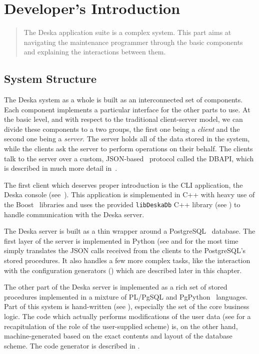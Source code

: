 \documentclass[deska]{subfiles}
\begin{document}
\chapter{Developer's Introduction}
\label{sec:dev-intro}

\begin{abstract}
The Deska application suite is a complex system.  This part aims at navigating the maintenance programmer through the
basic components and explaining the interactions between them.
\end{abstract}

\section{System Structure}
The Deska system as a whole is built as an interconnected set of components.  Each component implements a particular
interface for the other parts to use.  At the basic level, and with respect to the traditional client-server model, we
can divide these components to a two groups, the first one being a {\em client} and the second one being a {\em server}.
The server holds all of the data stored in the system, while the clients ask the server to perform operations on their
behalf.  The clients talk to the server over a custom, JSON-based~\cite{json} protocol called the DBAPI, which is
described in much more detail in~.

The first client which deserves proper introduction is the CLI application, the Deska console
(see~).  This application is simplemented in C++ with heavy use of the Boost~\cite{boost} libraries
and uses the provided {\tt libDeskaDb} C++ library (see ) to handle communication with the Deska
server.

The Deska server is built as a thin wrapper around a PostgreSQL~\cite{postgresql} database.  The first layer of the
server is implemented in Python (see  and for the most time simply translates the JSON calls
received from the clients to the PostgreSQL's stored procedures.  It also handles a few more complex tasks, like the
interaction with the configuration generators () which are described later in this
chapter.

The other part of the Deska server is implemented as a rich set of stored procedures implemented in a mixture of
PL/PgSQL and PgPython~\cite{pg-python} languages.  Part of this system is hand-written (see ),
especially the set of the core business logic.  The code which actually performs modifications of the user data (see
 for a recapitulation of the role of the user-supplied scheme) is, on the other hand,
machine-generated based on the exact contents and layout of the database scheme.  The code generator is described in
.
\end{document}

